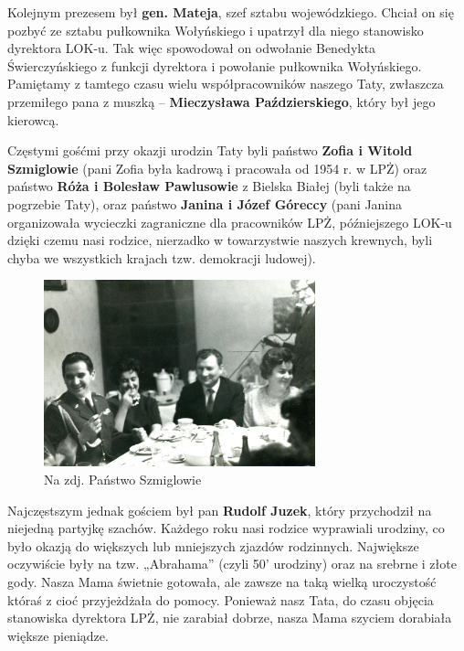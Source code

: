 Kolejnym prezesem był \textbf{gen. Mateja}, szef sztabu wojewódzkiego. Chciał on się pozbyć ze sztabu pułkownika Wołyńskiego i upatrzył dla niego stanowisko dyrektora LOK-u. Tak więc spowodował on odwołanie Benedykta Świerczyńskiego z funkcji dyrektora i powołanie pułkownika Wołyńskiego. Pamiętamy z tamtego czasu wielu współpracowników naszego Taty, zwłaszcza przemiłego pana z muszką – \textbf{Mieczysława Paździerskiego}, który był jego kierowcą.

Częstymi gośćmi przy okazji urodzin Taty byli państwo \textbf{Zofia i Witold Szmiglowie} (pani Zofia była kadrową i pracowała od 1954 r. w LPŻ) oraz państwo \textbf{Róża i Bolesław Pawlusowie} z Bielska Białej (byli także na pogrzebie Taty), oraz państwo \textbf{Janina i Józef Góreccy} (pani Janina organizowała wycieczki zagraniczne dla pracowników LPŻ, późniejszego LOK-u dzięki czemu nasi rodzice, nierzadko  w towarzystwie naszych krewnych, byli chyba we wszystkich krajach tzw. demokracji ludowej).
\begin{figure}[!h]
\begin{center}
\includegraphics[width=0.7\textwidth]{photo/szmiglowie.jpg}
\caption[Państwo Szmiglowie]{Na zdj. Państwo Szmiglowie}
\end{center}
\end{figure}

Najczęstszym jednak gościem był pan \textbf{Rudolf Juzek}, który przychodził na niejedną partyjkę szachów. Każdego roku nasi rodzice wyprawiali urodziny, co było okazją do większych lub mniejszych zjazdów rodzinnych. Największe oczywiście były na tzw. „Abrahama” (czyli 50’ urodziny) oraz na srebrne i złote gody. Nasza Mama świetnie gotowała, ale zawsze na taką wielką uroczystość któraś z cioć przyjeżdżała do pomocy. Ponieważ nasz Tata, do czasu objęcia stanowiska dyrektora LPŻ, nie zarabiał dobrze, nasza Mama szyciem dorabiała większe pieniądze. 














